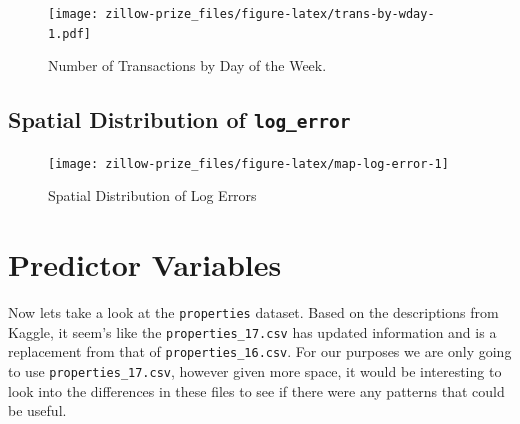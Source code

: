 \documentclass[]{book}
\newenvironment{Shaded}{\begin{snugshade}}{\end{snugshade}}
\newcommand{\KeywordTok}[1]{\textcolor[rgb]{0.13,0.29,0.53}{\textbf{#1}}}
\newcommand{\DataTypeTok}[1]{\textcolor[rgb]{0.13,0.29,0.53}{#1}}
\newcommand{\DecValTok}[1]{\textcolor[rgb]{0.00,0.00,0.81}{#1}}
\newcommand{\FloatTok}[1]{\textcolor[rgb]{0.00,0.00,0.81}{#1}}
\newcommand{\StringTok}[1]{\textcolor[rgb]{0.31,0.60,0.02}{#1}}
\newcommand{\OperatorTok}[1]{\textcolor[rgb]{0.81,0.36,0.00}{\textbf{#1}}}
\newcommand{\NormalTok}[1]{#1}
\theoremstyle{definition}
\theoremstyle{definition}
\theoremstyle{definition}
\theoremstyle{remark}
\begin{document}
\begin{figure}
\centering
\texttt{[image: zillow-prize\_files/figure-latex/trans-by-wday-1.pdf]}
\caption{\label{fig:trans-by-wday}Number of Transactions by Day of the
Week.}
\end{figure}

\subsection{\texorpdfstring{Spatial Distribution of
\texttt{log\_error}}{Spatial Distribution of log\_error}}\label{spatial-distribution-of-log_error}

\begin{Shaded}
\end{Shaded}

\begin{figure}
\texttt{[image: zillow-prize\_files/figure-latex/map-log-error-1]} \caption{Spatial Distribution of Log Errors}\label{fig:map-log-error}
\end{figure}

\section{Predictor Variables}\label{predictor-variables}

Now lets take a look at the \texttt{properties} dataset. Based on the
descriptions from Kaggle, it seem's like the \texttt{properties\_17.csv}
has updated information and is a replacement from that of
\texttt{properties\_16.csv}. For our purposes we are only going to use
\texttt{properties\_17.csv}, however given more space, it would be
interesting to look into the differences in these files to see if there
were any patterns that could be useful.
\end{document}
